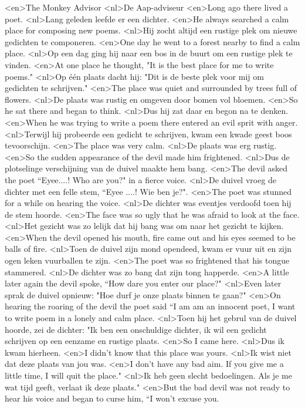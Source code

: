 <en>The Monkey Advisor
<nl>De Aap-adviseur
<en>Long ago there lived a poet.
<nl>Lang geleden leefde er een dichter.
<en>He always searched a calm place for composing new poems.
<nl>Hij zocht altijd een rustige plek om nieuwe gedichten te  componeren.
<en>One day he went to a forest nearby to find a calm place.
<nl>Op een dag ging hij naar een bos in de buurt om een rustige plek te vinden.
<en>At one place he thought, "It is the best place for me to write poems."
<nl>Op één plaats dacht hij: "Dit is de beste plek voor mij om gedichten te schrijven."
<en>The place was quiet and surrounded by trees full of flowers.
<nl>De plaats was rustig en omgeven door bomen vol bloemen.
<en>So he sat there and began to think.
<nl>Dus hij zat daar en begon na te denken.
<en>When he was trying to write a poem there entered an evil sprit with anger.
<nl>Terwijl hij probeerde een gedicht te schrijven, kwam een kwade geest boos tevoorschijn.
<en>The place was very calm.
<nl>De plaats was erg rustig.
<en>So the sudden appearance of the devil made him frightened.
<nl>Dus de plotselinge verschijning van de duivel maakte hem bang.
<en>The devil asked the poet “Eyee....! Who are you?" in a fierce voice.
<nl>De duivel vroeg de dichter met een felle stem, “Eyee ....! Wie ben je?".
<en>The poet was stunned for a while on hearing the voice.
<nl>De dichter was eventjes verdoofd toen hij de stem hoorde.
<en>The face was so ugly that he was afraid to look at the face.
<nl>Het gezicht was zo lelijk dat hij bang was om naar het gezicht te kijken.
<en>When the devil opened his mouth, fire came out and his eyes seemed to be balls of fire.
<nl>Toen de duivel zijn mond opendeed, kwam er vuur uit en zijn ogen leken vuurballen te zijn.
<en>The poet was so frightened that his tongue stammered.
<nl>De dichter was zo bang dat zijn tong happerde.
<en>A little later again the devil spoke, “How dare you enter our place?"
<nl>Even later sprak de duivel opnieuw: "Hoe durf je onze plaats binnen te gaan?"
<en>On hearing the roaring of the devil the poet said “I am am an innocent poet, I want to write poem in a lonely and calm place.
<nl>Toen hij het gebrul van de duivel hoorde, zei de dichter: "Ik ben een onschuldige dichter, ik wil een gedicht schrijven op een eenzame en rustige plaats.
<en>So I came here.
<nl>Dus ik kwam hierheen.
<en>I didn’t know that this place was yours.
<nl>Ik wist niet dat deze plaats van jou was.
<en>I don’t have any bad aim. If you give me a little time, I will quit the place."
<nl>Ik heb geen slecht bedoelingen. Als je me wat tijd geeft, verlaat  ik deze plaats."
<en>But the bad devil was not ready to hear his voice and began to curse him, “I won’t excuse you.
